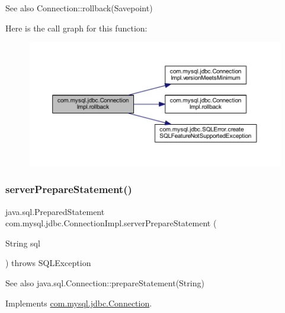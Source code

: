 \begin{DoxySeeAlso}{See also}
Connection\+::rollback(\+Savepoint) 
\end{DoxySeeAlso}
Here is the call graph for this function\+:\nopagebreak
\begin{figure}[H]
\begin{center}
\leavevmode
\includegraphics[width=350pt]{classcom_1_1mysql_1_1jdbc_1_1_connection_impl_a2e3bce3038d1c58eedcfdfe49c82f904_cgraph}
\end{center}
\end{figure}
\mbox{\label{classcom_1_1mysql_1_1jdbc_1_1_connection_impl_a32bbaa44990d6c0094b9697bf298bb60}} 
\subsubsection{\texorpdfstring{server\+Prepare\+Statement()}{serverPrepareStatement()}\hspace{0.1cm}{\footnotesize\ttfamily [1/6]}}
{\footnotesize\ttfamily java.\+sql.\+Prepared\+Statement com.\+mysql.\+jdbc.\+Connection\+Impl.\+server\+Prepare\+Statement (\begin{DoxyParamCaption}\item[{String}]{sql }\end{DoxyParamCaption}) throws S\+Q\+L\+Exception}

\begin{DoxySeeAlso}{See also}
java.\+sql.\+Connection\+::prepare\+Statement(\+String) 
\end{DoxySeeAlso}


Implements \mbox{\hyperlink{interfacecom_1_1mysql_1_1jdbc_1_1_connection_a6e2680bb0a1c38613a4788de1916b596}{com.\+mysql.\+jdbc.\+Connection}}.

